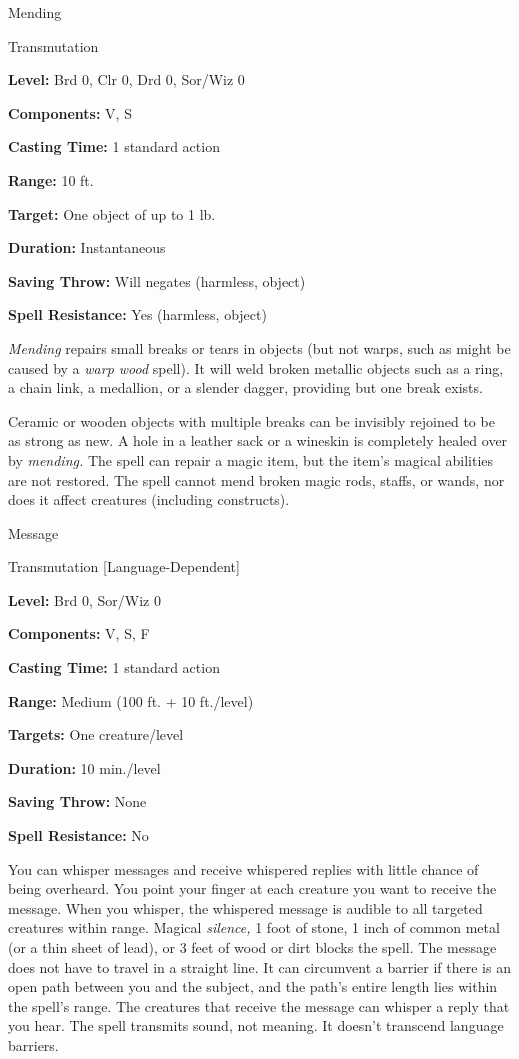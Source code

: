 \documentclass{article}
\begin{document}
\vspace{12pt}
Mending

Transmutation

\textbf{Level:} Brd 0, Clr 0, Drd 0, Sor/Wiz 0

\textbf{Components:} V, S

\textbf{Casting Time:} 1 standard action

\textbf{Range:} 10 ft.

\textbf{Target:} One object of up to 1 lb.

\textbf{Duration:} Instantaneous

\textbf{Saving Throw: }Will negates (harmless, object)

\textbf{Spell Resistance:} Yes (harmless, object)

\textit{Mending }repairs small breaks or tears in objects (but not warps, such 
as might be caused by a \textit{warp wood }spell). It will weld broken metallic 
objects such as a ring, a chain link, a medallion, or a slender dagger, providing 
but one break exists.

Ceramic or wooden objects with multiple breaks can be invisibly rejoined to be 
as strong as new. A hole in a leather sack or a wineskin is completely healed over 
by \textit{mending. }The spell can repair a magic item, but the item's magical 
abilities are not restored. The spell cannot mend broken magic rods, staffs, or 
wands, nor does it affect creatures (including constructs).

\vspace{12pt}
Message

Transmutation [Language-Dependent]

\textbf{Level:} Brd 0, Sor/Wiz 0

\textbf{Components:} V, S, F

\textbf{Casting Time:} 1 standard action

\textbf{Range: }Medium (100 ft. + 10 ft./level)

\textbf{Targets:} One creature/level

\textbf{Duration:} 10 min./level

\textbf{Saving Throw:} None

\textbf{Spell Resistance:} No

You can whisper messages and receive whispered replies with little chance of being 
overheard. You point your finger at each creature you want to receive the message. 
When you whisper, the whispered message is audible to all targeted creatures within 
range. Magical \textit{silence, }1 foot of stone, 1 inch of common metal (or a 
thin sheet of lead), or 3 feet of wood or dirt blocks the spell. The message does 
not have to travel in a straight line. It can circumvent a barrier if there is 
an open path between you and the subject, and the path's entire length lies within 
the spell's range. The creatures that receive the message can whisper a reply that 
you hear. The spell transmits sound, not meaning. It doesn't transcend language 
barriers.
\end{document}
